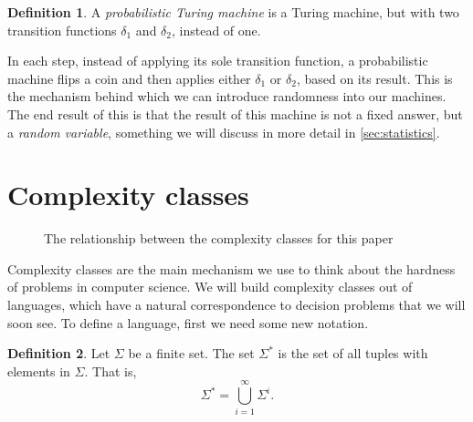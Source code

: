 \documentclass[english,12pt]{reedthesis}
\theoremstyle{plain}
\theoremstyle{definition}
\newtheorem{defn}[defn]{Definition}
\theoremstyle{remark}
\begin{document}
\begin{defn}\label{def:prob-tm}
  A \emph{probabilistic Turing machine} is a Turing machine, but with two
  transition functions $\delta_{1}$ and $\delta_{2}$, instead of one.
\end{defn}

In each step, instead of applying its sole transition function, a probabilistic
machine flips a coin and then applies either $\delta_{1}$ or $\delta_{2}$, based on its
result. This is the mechanism behind which we can introduce randomness into our
machines. The end result of this is that the result of this machine is not a
fixed answer, but a \emph{random variable}, something we will discuss in more
detail in \cref{sec:statistics}.

\section{Complexity classes}\label{sec:comp-class}

\begin{figure}[htbp]
  \centering
  \caption{The relationship between the complexity classes for this
    paper}\label{fig:comp-class}
\end{figure}

Complexity classes are the main mechanism we use to think about the hardness of
problems in computer science. We will build complexity classes out of languages,
which have a natural correspondence to decision problems that we will soon see.
To define a language, first we need some new notation.

\begin{defn}\label{def:sigma-star}
  Let $\Sigma$ be a finite set. The set $\Sigma^{*}$ is the set of all tuples with
  elements in $\Sigma$. That is,
  \begin{equation*}
    \Sigma^{*} = \bigcup_{i=1}^{\infty}\Sigma^{i}.
  \end{equation*}
\end{defn}
\end{document}
